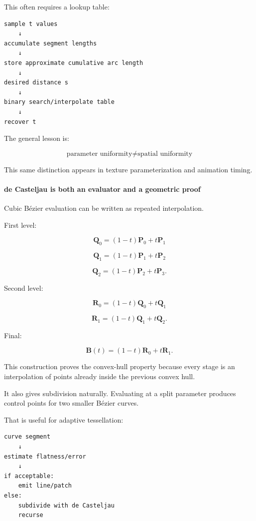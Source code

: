 This often requires a lookup table:

\begin{verbatim}
sample t values
    ↓
accumulate segment lengths
    ↓
store approximate cumulative arc length
    ↓
desired distance s
    ↓
binary search/interpolate table
    ↓
recover t
\end{verbatim}

The general lesson is:

\[
\boxed{
\text{parameter uniformity}
\neq
\text{spatial uniformity}
}
\]

This same distinction appears in texture parameterization and animation timing.

\paragraph{de Casteljau is both an evaluator and a geometric proof}\label{03-visual-computing-i-ch001-de-casteljau-is-both-an-evaluator-and-a-geometric-proof}

\hypertarget{03-visual-computing-i-ch001-de-casteljau-is-both-an-evaluator-and-a-geometric-proof}{}

Cubic Bézier evaluation can be written as repeated interpolation.

First level:

\[
\mathbf Q_0=(1-t)\mathbf P_0+t\mathbf P_1
\]

\[
\mathbf Q_1=(1-t)\mathbf P_1+t\mathbf P_2
\]

\[
\mathbf Q_2=(1-t)\mathbf P_2+t\mathbf P_3.
\]

Second level:

\[
\mathbf R_0=(1-t)\mathbf Q_0+t\mathbf Q_1
\]

\[
\mathbf R_1=(1-t)\mathbf Q_1+t\mathbf Q_2.
\]

Final:

\[
\mathbf B(t)=(1-t)\mathbf R_0+t\mathbf R_1.
\]

This construction proves the convex-hull property because every stage is an interpolation of points already inside the previous convex hull.

It also gives subdivision naturally. Evaluating at a split parameter produces control points for two smaller Bézier curves.

That is useful for adaptive tessellation:

\begin{verbatim}
curve segment
    ↓
estimate flatness/error
    ↓
if acceptable:
    emit line/patch
else:
    subdivide with de Casteljau
    recurse
\end{verbatim}

